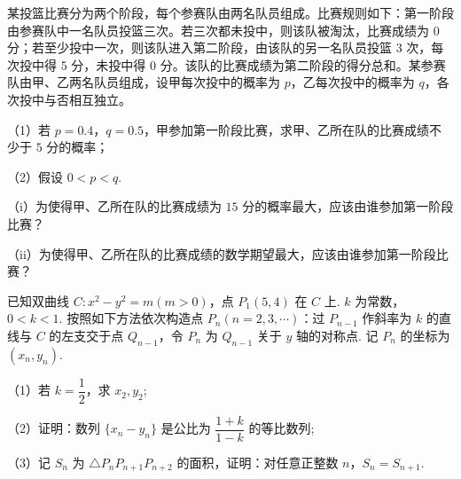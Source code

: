 \documentclass{exam-zh}
\begin{document}
\begin{problem}[points = 17]
某投篮比赛分为两个阶段，每个参赛队由两名队员组成。比赛规则如下：第一阶段由参赛队中一名队员投篮三次。若三次都未投中，则该队被淘汰，比赛成绩为 $0$ 分；若至少投中一次，则该队进入第二阶段，由该队的另一名队员投篮 $3$ 次，每次投中得 $5$ 分，未投中得 $0$ 分。该队的比赛成绩为第二阶段的得分总和。某参赛队由甲、乙两名队员组成，设甲每次投中的概率为 $p$，乙每次投中的概率为 $q$，各次投中与否相互独立。

（1）若 $p=0.4$，$q=0.5$，甲参加第一阶段比赛，求甲、乙所在队的比赛成绩不少于 $5$ 分的概率；

（2）假设 $0<p<q$.

（i）为使得甲、乙所在队的比赛成绩为 $15$ 分的概率最大，应该由谁参加第一阶段比赛？

（ii）为使得甲、乙所在队的比赛成绩的数学期望最大，应该由谁参加第一阶段比赛？
\end{problem}

\begin{problem}[points = 17]
已知双曲线 $C: x^2-y^2=m(m>0)$，点 $P_1(5,4)$ 在 $C$ 上. $k$ 为常数，$0<k<1$. 按照如下方法依次构造点 $P_n(n=2,3,\cdots)$：过 $P_{n-1}$ 作斜率为 $k$ 的直线与 $C$ 的左支交于点 $Q_{n-1}$，令 $P_n$ 为 $Q_{n-1}$ 关于 $y$ 轴的对称点. 记 $P_n$ 的坐标为 $(x_n, y_n)$.

（1）若 $k=\dfrac{1}{2}$，求 $x_2, y_2$;

（2）证明：数列 $\{x_n-y_n\}$ 是公比为 $\dfrac{1+k}{1-k}$ 的等比数列;

（3）记 $S_n$ 为 $\triangle P_n P_{n+1} P_{n+2}$ 的面积，证明：对任意正整数 $n$，$S_n=S_{n+1}$.
\end{problem}
\end{document}

